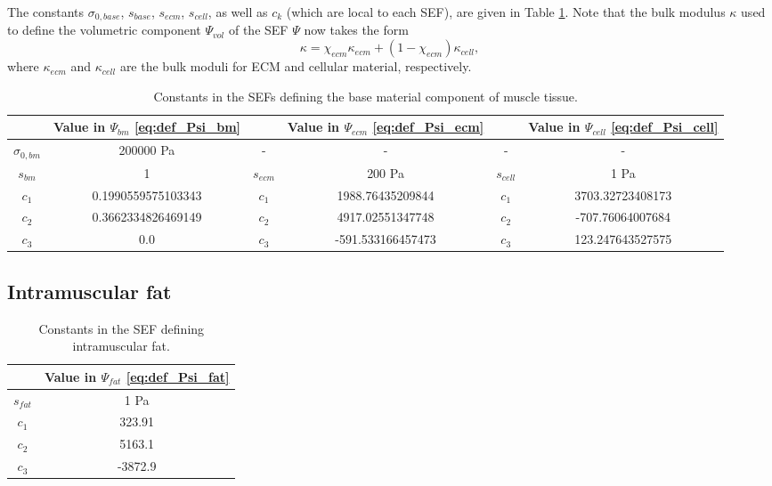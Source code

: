 \documentclass{sfuthesis}
\numberwithin{equation}{section}
\numberwithin{figure}{chapter}
\numberwithin{table}{chapter}
\theoremstyle{definition}
\begin{document}
The constants $\sigma_{0,base}$, $s_{base}$, $s_{ecm}$, $s_{cell}$, as well as $c_k$ (which are local to each SEF), are given in Table \ref{tab:constants_base_material_muscle}. Note that the bulk modulus $\kappa$ used to define the volumetric component $\Psi_{vol}$ of the SEF $\Psi$ now takes the form
\begin{equation} \label{eq:def_kappa_ecm_cell}
    \kappa = \chi_{ecm} \kappa_{ecm} + (1-\chi_{ecm}) \kappa_{cell},
\end{equation}
where $\kappa_{ecm}$ and $\kappa_{cell}$ are the bulk moduli for ECM and cellular material, respectively.

\begin{table}
    \centering
    \begin{tabular}{|c|c|c|c|c|c|}\hline
        & Value in $\Psi_{bm}$ \eqref{eq:def_Psi_bm} & & Value in $\Psi_{ecm}$ \eqref{eq:def_Psi_ecm} & & Value in $\Psi_{cell}$ \eqref{eq:def_Psi_cell} \\\hline
        $\sigma_{0,bm}$ & 200000 \si{Pa} & - & - & - & - \\\hline
        $s_{bm}$ & 1 & $s_{ecm}$ & 200 \si{Pa} & $s_{cell}$ & 1 \si{Pa} \\\hline
        $c_1$ & 0.1990559575103343 & $c_1$ & 1988.76435209844 & $c_1$ & 3703.32723408173 \\\hline
        $c_2$ & 0.3662334826469149 & $c_2$ & 4917.02551347748 & $c_2$ & -707.76064007684 \\\hline
        $c_3$ & 0.0 & $c_3$ & -591.533166457473 & $c_3$ & 123.247643527575 \\\hline
    \end{tabular}
    \caption{Constants in the SEFs defining the base material component of muscle tissue.
    \label{tab:constants_base_material_muscle}}
\end{table}

\subsection{Intramuscular fat}

\begin{table}
    \centering
    \begin{tabular}{|c|c|}\hline
        & Value in $\Psi_{fat}$ \eqref{eq:def_Psi_fat} \\\hline
        $s_{fat}$ & 1 \si{Pa} \\\hline
        $c_1$ & 323.91 \\\hline
        $c_2$ & 5163.1 \\\hline
        $c_3$ & -3872.9 \\\hline
    \end{tabular}
    \caption{Constants in the SEF defining intramuscular fat. \label{tab:constants_fat}}
\end{table}
\end{document}

